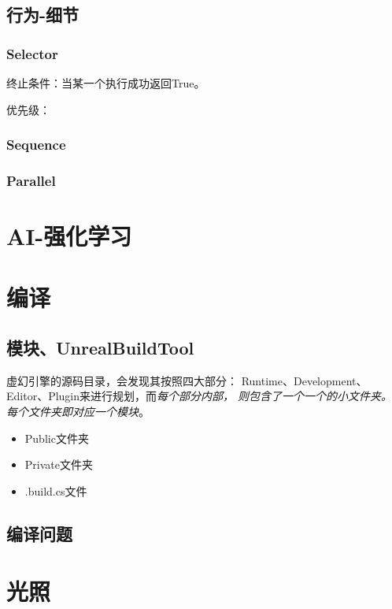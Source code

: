\documentclass[UTF8,a4paper,12pt]{ctexbook}
\begin{document}
	
	\section{行为-细节}
		\subsection{Selector}
			终止条件：当某一个执行成功返回True。
			
			优先级：
		
		\subsection{Sequence}
			
		
		\subsection{Parallel}
		
		

\chapter{AI-强化学习}	





\chapter{编译}
	\section{模块、UnrealBuildTool}
		虚幻引擎的源码目录，会发现其按照四大部分： Runtime、Development、Editor、Plugin来进行规划，而\textit{每个部分内部， 则包含了一个一个的小文件夹。每个文件夹即对应一个模块}。
		
		\begin{itemize}
			\item Public文件夹 
			\item Private文件夹 
			\item .build.cs文件
		\end{itemize}
	
	\section{编译问题}
	
	




\chapter{光照}
	
\end{document}
